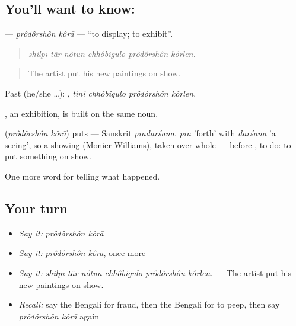 \subsection*{You'll want to know:  }
\textbf{ } — \emph{prôdôrshôn kôrā} — \textquotedblleft{}to display; to exhibit\textquotedblright{}.

\begin{quote}
     
\end{quote}

\begin{quote}
\emph{shilpī tā̃r nôtun chhôbigulo prôdôrshôn kôrlen.}
\end{quote}

\begin{quote}
The artist put his new paintings on show.
\end{quote}

Past (he/she …):    , \emph{tini chhôbigulo prôdôrshôn kôrlen}.

, an exhibition, is built on the same noun.

\begin{cousinweb}
\textbf{ } (\emph{prôdôrshôn kôrā}) puts  — Sanskrit \emph{pradarśana}, \emph{pra} 'forth' with \emph{darśana} 'a seeing', so a showing (Monier-Williams), taken over whole — before , to do: to put something on show.
\end{cousinweb}

\begin{grammarlens}[title={What you've built}]
One more word for telling what happened.
\end{grammarlens}

\subsection*{Your turn}
\begin{itemize}
\raggedright
  \item \emph{Say it:} \emph{prôdôrshôn kôrā}
  \item \emph{Say it:} \emph{prôdôrshôn kôrā}, once more
  \item \emph{Say it:} \emph{shilpī tā̃r nôtun chhôbigulo prôdôrshôn kôrlen.} — The artist put his new paintings on show.
  \item \emph{Recall:} say the Bengali for fraud, then the Bengali for to peep, then say \emph{prôdôrshôn kôrā} again
\end{itemize}

